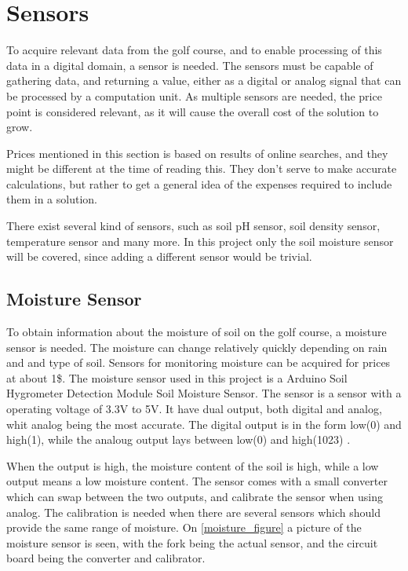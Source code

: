 \section{Sensors} \label{cha:sensorChapter}
To acquire relevant data from the golf course, and to enable processing of this data in a digital domain, a sensor is needed.
The sensors must be capable of gathering data, and returning a value, either as a digital or analog signal that can be processed by a computation unit.
As multiple sensors are needed, the price point is considered relevant, as it will cause the overall cost of the solution to grow.

Prices mentioned in this section is based on results of online searches, and they might be different at the time of reading this.
They don't serve to make accurate calculations, but rather to get a general idea of the expenses required to include them in a solution.

There exist several kind of sensors, such as soil pH sensor, soil density sensor, temperature sensor and many more. In this project only the soil moisture sensor will be covered, since adding a different sensor would be trivial.

\subsection{Moisture Sensor}
To obtain information about the moisture of soil on the golf course, a moisture sensor is needed.
The moisture can change relatively quickly depending on rain and and type of soil.
Sensors for monitoring moisture can be acquired for prices at about 1\$.
The moisture sensor used in this project is a Arduino Soil Hygrometer Detection Module Soil Moisture Sensor.
The sensor is a sensor with a operating voltage of 3.3V to 5V.
It have dual output, both digital and analog, whit analog being the most accurate.
The digital output is in the form low(0) and high(1), while the analoug output lays between low(0) and high(1023) \cite{moisture}.

When the output is high, the moisture content of the soil is high, while a low output means a low moisture content.
The sensor comes with a small converter which can swap between the two outputs, and calibrate the sensor when using analog.
The calibration is needed when there are several sensors which should provide the same range of moisture.
On \ref{moisture_figure} a picture of the moisture sensor is seen, with the fork being the actual sensor, and the circuit board being the converter and calibrator. 

